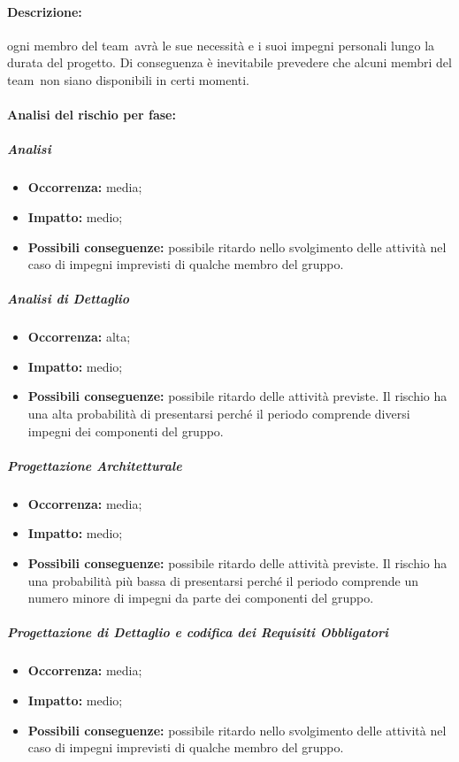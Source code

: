 \documentclass[../PianoProgetto.tex]{subfiles}
\begin{document}
	\paragraph*{Descrizione:} ogni membro del team\g\ avrà le sue necessità e i suoi impegni personali lungo la durata del progetto. Di conseguenza è inevitabile prevedere che alcuni membri del team\g\ non siano disponibili in certi momenti.
	 
	\paragraph*{Analisi del rischio per fase:} 

		\subparagraph*{Analisi}
			\begin{itemize}[label={-}]
				\item \textbf{Occorrenza:} media;
				\item \textbf{Impatto:} medio;
				\item \textbf{Possibili conseguenze:} possibile ritardo nello svolgimento delle attività nel caso di impegni imprevisti di qualche membro del gruppo.
			\end{itemize}
			
		\subparagraph*{Analisi di Dettaglio}
			\begin{itemize}[label={-}]
				\item \textbf{Occorrenza:} alta;
				\item \textbf{Impatto:} medio;
				\item \textbf{Possibili conseguenze:} possibile ritardo delle attività previste. Il rischio ha una alta probabilità di presentarsi perché il periodo comprende diversi impegni dei componenti del gruppo.
			\end{itemize}
			
		\subparagraph*{Progettazione Architetturale}
			\begin{itemize}[label={-}]
				\item \textbf{Occorrenza:} media;
				\item \textbf{Impatto:} medio;
				\item \textbf{Possibili conseguenze:} possibile ritardo delle attività previste. Il rischio ha una probabilità più bassa di presentarsi perché il periodo comprende un numero minore di impegni da parte dei componenti del gruppo.
			\end{itemize}
			
		\subparagraph*{Progettazione di Dettaglio e codifica dei Requisiti Obbligatori}
			\begin{itemize}[label={-}]
				\item \textbf{Occorrenza:} media;
				\item \textbf{Impatto:} medio;
				\item \textbf{Possibili conseguenze:} possibile ritardo nello svolgimento delle attività nel caso di impegni imprevisti di qualche membro del gruppo.
			\end{itemize}
			
\end{document}
